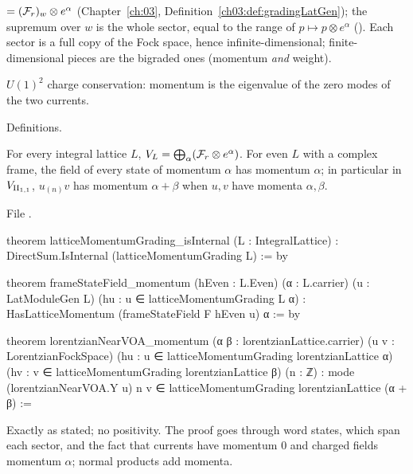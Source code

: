 \begin{dictionary}
 $=(\mathcal{F}_r)_w\otimes e^\alpha$ (Chapter~\ref{ch:03}, Definition~\ref{ch03:def:gradingLatGen});
the supremum over $w$ is the whole sector, equal to the range of $p\mapsto p\otimes e^\alpha$
().  Each sector is a full copy of the Fock space, hence
infinite-dimensional; finite-dimensional pieces are the bigraded ones (momentum \emph{and} weight).
\end{dictionary}

\begin{physics}
$U(1)^2$ charge conservation: momentum is the eigenvalue of the zero modes of the two currents.
\end{physics}

\begin{status}
Definitions.
\end{status}

\begin{theorem}\label{ch17:thm:momentum}
For every integral lattice $L$, $V_L=\bigoplus_\alpha(\mathcal{F}_r\otimes e^\alpha)$.  For even $L$ with a complex frame,
the field of every state of momentum $\alpha$ has momentum $\alpha$; in particular in ${V_{\mathrm{II}_{1,1}}}$,
$u_{(n)}v$ has momentum $\alpha+\beta$ when $u,v$ have momenta $\alpha,\beta$.
\end{theorem}

\noindent File .
\begin{leancode}
theorem latticeMomentumGrading_isInternal (L : IntegralLattice) :
    DirectSum.IsInternal (latticeMomentumGrading L) := by

theorem frameStateField_momentum (hEven : L.Even) (α : L.carrier)
    (u : LatModuleGen L) (hu : u ∈ latticeMomentumGrading L α) :
    HasLatticeMomentum (frameStateField F hEven u) α := by

theorem lorentzianNearVOA_momentum (α β : lorentzianLattice.carrier)
    (u v : LorentzianFockSpace) (hu : u ∈ latticeMomentumGrading lorentzianLattice α)
    (hv : v ∈ latticeMomentumGrading lorentzianLattice β) (n : ℤ) :
    mode (lorentzianNearVOA.Y u) n v ∈ latticeMomentumGrading lorentzianLattice (α + β) :=
\end{leancode}

\begin{dictionary}
Exactly as stated; no positivity.  The proof goes through word states, which span each sector, and the
fact that currents have momentum $0$ and charged fields momentum $\alpha$; normal products add momenta.
\end{dictionary}

